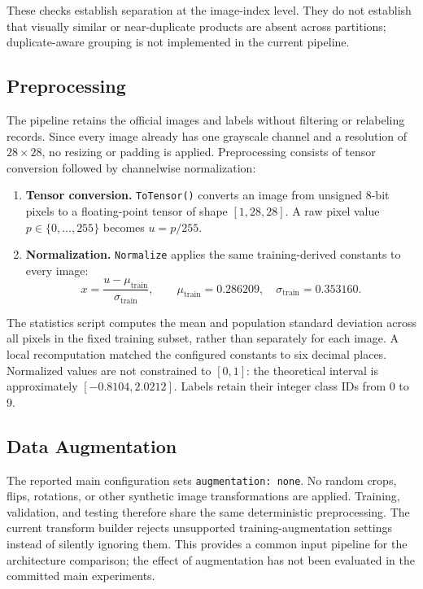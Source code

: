 These checks establish separation at the image-index level. They do not establish that visually similar or near-duplicate products are absent across partitions; duplicate-aware grouping is not implemented in the current pipeline.

\subsection{Preprocessing}

The pipeline retains the official images and labels without filtering or relabeling records. Since every image already has one grayscale channel and a resolution of $28\times28$, no resizing or padding is applied. Preprocessing consists of tensor conversion followed by channelwise normalization:
\begin{enumerate}
    \item \textbf{Tensor conversion.} \texttt{ToTensor()} converts an image from unsigned 8-bit pixels to a floating-point tensor of shape $[1,28,28]$. A raw pixel value $p\in\{0,\ldots,255\}$ becomes $u=p/255$.
    \item \textbf{Normalization.} \texttt{Normalize} applies the same training-derived constants to every image:
    \begin{equation}
        x=\frac{u-\mu_{\mathrm{train}}}{\sigma_{\mathrm{train}}},
        \qquad
        \mu_{\mathrm{train}}=0.286209,
        \quad
        \sigma_{\mathrm{train}}=0.353160.
    \end{equation}
\end{enumerate}

The statistics script computes the mean and population standard deviation across all pixels in the fixed training subset, rather than separately for each image. A local recomputation matched the configured constants to six decimal places. Normalized values are not constrained to $[0,1]$: the theoretical interval is approximately $[-0.8104,2.0212]$. Labels retain their integer class IDs from 0 to 9.

\subsection{Data Augmentation}

The reported main configuration sets \texttt{augmentation: none}. No random crops, flips, rotations, or other synthetic image transformations are applied. Training, validation, and testing therefore share the same deterministic preprocessing. The current transform builder rejects unsupported training-augmentation settings instead of silently ignoring them. This provides a common input pipeline for the architecture comparison; the effect of augmentation has not been evaluated in the committed main experiments.

